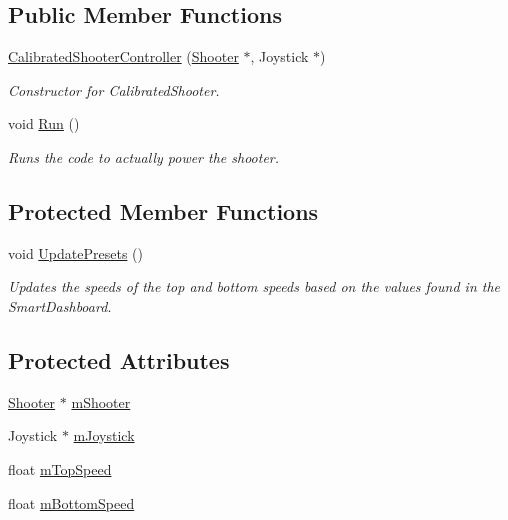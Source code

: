 \subsection*{\-Public \-Member \-Functions}
\begin{DoxyCompactItemize}
\item 
\hyperlink{class_calibrated_shooter_controller_abb110a11bd9c361c7e039f76f3be24e0}{\-Calibrated\-Shooter\-Controller} (\hyperlink{class_shooter}{\-Shooter} $\ast$, \-Joystick $\ast$)
\begin{DoxyCompactList}\small\item\em \-Constructor for \-Calibrated\-Shooter. \end{DoxyCompactList}\item 
void \hyperlink{class_calibrated_shooter_controller_a9910e6771c5592b80ca567f25e767f66}{\-Run} ()
\begin{DoxyCompactList}\small\item\em \-Runs the code to actually power the shooter. \end{DoxyCompactList}\end{DoxyCompactItemize}
\subsection*{\-Protected \-Member \-Functions}
\begin{DoxyCompactItemize}
\item 
void \hyperlink{class_calibrated_shooter_controller_ab7799ac7013ba36a2a1d90c6e7c57564}{\-Update\-Presets} ()
\begin{DoxyCompactList}\small\item\em \-Updates the speeds of the top and bottom speeds based on the values found in the \-Smart\-Dashboard. \end{DoxyCompactList}\end{DoxyCompactItemize}
\subsection*{\-Protected \-Attributes}
\begin{DoxyCompactItemize}
\item 
\hyperlink{class_shooter}{\-Shooter} $\ast$ \hyperlink{class_calibrated_shooter_controller_a120eb4562c3206cdb49600212b4a548b}{m\-Shooter}
\item 
\-Joystick $\ast$ \hyperlink{class_calibrated_shooter_controller_a037955915eb9d5f6db43d011285d68a4}{m\-Joystick}
\item 
float \hyperlink{class_calibrated_shooter_controller_af53b6f35b4f23b156b1213f9c415adff}{m\-Top\-Speed}
\item 
float \hyperlink{class_calibrated_shooter_controller_a58a13a82b2f5c9c9273938ef096d152e}{m\-Bottom\-Speed}
\end{DoxyCompactItemize}


